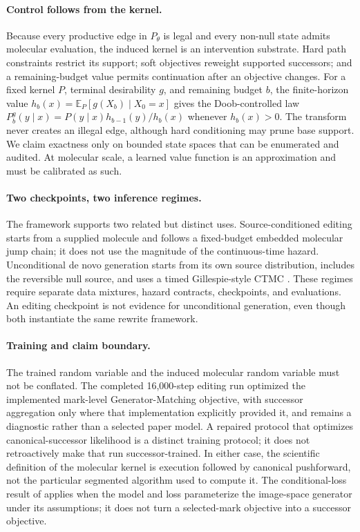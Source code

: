 \documentclass[10pt,letterpaper]{article}
\newcommand{\E}{\mathbb{E}}
\begin{document}
\paragraph{Control follows from the kernel.}
Because every productive edge in $P_\theta$ is legal and every non-null state
admits molecular evaluation, the induced kernel is an intervention substrate.
Hard path constraints restrict its support; soft objectives reweight supported
successors; and a remaining-budget value permits continuation after an
objective changes. For a fixed kernel $P$, terminal desirability $g$, and
remaining budget $b$, the finite-horizon value
$h_b(x)=\E_P[g(X_b)\mid X_0=x]$ gives the Doob-controlled law
$P_b^g(y\mid x)=P(y\mid x)h_{b-1}(y)/h_b(x)$ whenever $h_b(x)>0$.
The transform never creates an illegal edge, although hard conditioning may
prune base support. We claim exactness only on bounded state spaces that can be
enumerated and audited. At molecular scale, a learned value function is an
approximation and must be calibrated as such.

\paragraph{Two checkpoints, two inference regimes.}
The framework supports two related but distinct uses. Source-conditioned
editing starts from a supplied molecule and follows a fixed-budget embedded
molecular jump chain; it does not use the magnitude of the continuous-time
hazard. Unconditional de novo generation starts from its own source
distribution, includes the reversible null source, and uses a timed
Gillespie-style CTMC \citep{gillespie1977}. These regimes require separate data
mixtures, hazard contracts, checkpoints, and evaluations. An editing
checkpoint is not evidence for unconditional generation, even though both
instantiate the same rewrite framework.

\paragraph{Training and claim boundary.}
The trained random variable and the induced molecular random variable must not
be conflated. The completed 16,000-step editing run optimized the implemented
mark-level Generator-Matching objective, with successor aggregation only where
that implementation explicitly provided it, and remains a diagnostic rather
than a selected paper model. A repaired protocol that optimizes
canonical-successor likelihood is a distinct training protocol; it does not
retroactively make that run successor-trained. In either case, the scientific
definition of the molecular kernel is execution followed by canonical
pushforward, not the particular segmented algorithm used to compute it.
The conditional-loss result of \citet{billera2026latent} applies when the model
and loss parameterize the image-space generator under its assumptions; it does
not turn a selected-mark objective into a successor objective.
\end{document}
